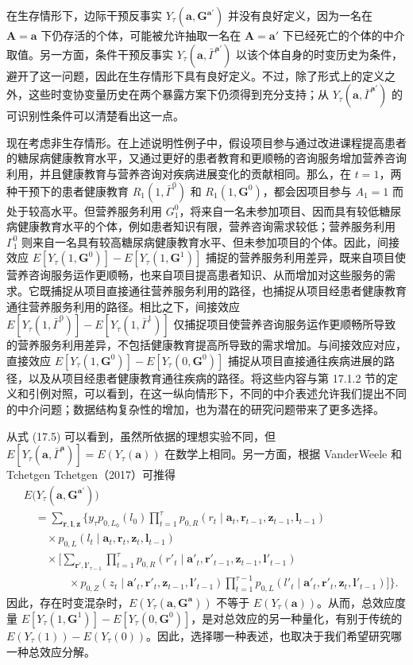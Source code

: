 在生存情形下，边际干预反事实 $Y_\tau(\mathbf a,\mathbf G^{\mathbf a'})$ 并没有良好定义，因为一名在 $\mathbf A=\mathbf a$ 下仍存活的个体，可能被允许抽取一名在 $\mathbf A=\mathbf a'$ 下已经死亡的个体的中介取值。另一方面，条件干预反事实 $Y_\tau(\mathbf a,\bar\Gamma^{\mathbf a'})$ 以该个体自身的时变历史为条件，避开了这一问题，因此在生存情形下具有良好定义。不过，除了形式上的定义之外，这些时变协变量历史在两个暴露方案下仍须得到充分支持；从 $Y_\tau(\mathbf a,\bar\Gamma^{\mathbf a'})$ 的可识别性条件可以清楚看出这一点。

现在考虑非生存情形。在上述说明性例子中，假设项目参与通过改进课程提高患者的糖尿病健康教育水平，又通过更好的患者教育和更顺畅的咨询服务增加营养咨询利用，并且健康教育与营养咨询对疾病进展变化的贡献相同。那么，在 $t=1$，两种干预下的患者健康教育 $R_1(1,\bar\Gamma^0)$ 和 $R_1(1,\mathbf G^0)$，都会因项目参与 $A_1=1$ 而处于较高水平。但营养服务利用 $G_1^0$，将来自一名未参加项目、因而具有较低糖尿病健康教育水平的个体，例如患者知识有限，营养咨询需求较低；营养服务利用 $\Gamma_1^0$ 则来自一名具有较高糖尿病健康教育水平、但未参加项目的个体。因此，间接效应 $E[Y_\tau(1,\mathbf G^0)]-E[Y_\tau(1,\mathbf G^1)]$ 捕捉的营养服务利用差异，既来自项目使营养咨询服务运作更顺畅，也来自项目提高患者知识、从而增加对这些服务的需求。它既捕捉从项目直接通往营养服务利用的路径，也捕捉从项目经患者健康教育通往营养服务利用的路径。相比之下，间接效应 $E[Y_\tau(1,\bar\Gamma^0)]-E[Y_\tau(1,\bar\Gamma^1)]$ 仅捕捉项目使营养咨询服务运作更顺畅所导致的营养服务利用差异，不包括健康教育提高所导致的需求增加。与间接效应对应，直接效应 $E[Y_\tau(1,\mathbf G^0)]-E[Y_\tau(0,\mathbf G^0)]$ 捕捉从项目直接通往疾病进展的路径，以及从项目经患者健康教育通往疾病的路径。将这些内容与第 17.1.2 节的定义和引例对照，可以看到，在这一纵向情形下，不同的中介表述允许我们提出不同的中介问题；数据结构复杂性的增加，也为潜在的研究问题带来了更多选择。

从式 (17.5) 可以看到，虽然所依据的理想实验不同，但 $E[Y_\tau(\mathbf a,\bar\Gamma^{\mathbf a})]=E(Y_\tau(\mathbf a))$ 在数学上相同。另一方面，根据 VanderWeele 和 Tchetgen Tchetgen（2017）可推得
\[
\begin{aligned}
 &E\bigl(Y_\tau(\mathbf a,\mathbf G^{\mathbf a'})\bigr)\\
 &\quad=\sum_{\mathbf r,\mathbf l,\mathbf z}\Biggl\{y_\tau p_{0,L_0}(l_0)
 \prod_{t=1}^\tau p_{0,R}(r_t\mid\mathbf a_t,\mathbf r_{t-1},\mathbf z_{t-1},\mathbf l_{t-1})\\
 &\qquad{}\times p_{0,L}(l_t\mid\mathbf a_t,\mathbf r_t,\mathbf z_t,\mathbf l_{t-1})\\
 &\qquad{}\times\Biggl[\sum_{\mathbf r',\mathbf l'_{\tau-1}}
 \prod_{t=1}^\tau p_{0,R}(r'_t\mid\mathbf a'_t,\mathbf r'_{t-1},\mathbf z_{t-1},\mathbf l'_{t-1})\\
 &\qquad\qquad{}\times p_{0,Z}(z_t\mid\mathbf a'_t,\mathbf r'_t,\mathbf z_{t-1},\mathbf l'_{t-1})
 \prod_{t=1}^{\tau-1}p_{0,L}(l'_t\mid\mathbf a'_t,\mathbf r'_t,\mathbf z_t,\mathbf l'_{t-1})\Biggr]\Biggr\}.
\end{aligned}
\]
因此，存在时变混杂时，$E(Y_\tau(\mathbf a,\mathbf G^{\mathbf a}))$ 不等于 $E(Y_\tau(\mathbf a))$。从而，总效应度量 $E[Y_\tau(1,\mathbf G^1)]-E[Y_\tau(0,\mathbf G^0)]$，是对总效应的另一种量化，有别于传统的 $E(Y_\tau(1))-E(Y_\tau(0))$。因此，选择哪一种表述，也取决于我们希望研究哪一种总效应分解。

